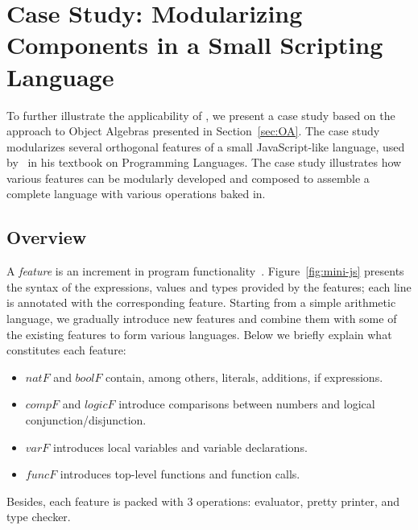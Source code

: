 \section{Case Study: Modularizing Components in a Small Scripting Language}

To further illustrate the applicability of \name, we present a case study based
on the approach to Object Algebras presented in Section~\ref{sec:OA}. The case
study modularizes several orthogonal features of a small
JavaScript-like language, used by~\citet{poplcook} in his textbook
on Programming Languages. The case study illustrates how various features can be
modularly developed and composed to assemble a complete language with
various operations baked in.



\subsection{Overview}

A \textit{feature} is an increment in program
functionality~\citep{zave1999faq,lopez2005evaluating}. Figure~\ref{fig:mini-js}
presents the syntax of the expressions, values and types provided by the
features; each line is annotated with the corresponding feature. Starting from a
simple arithmetic language, we gradually introduce new features and combine them
with some of the existing features to form various languages. Below we briefly
explain what constitutes each feature:
\begin{itemize}
\item $\mathit{natF}$ and $\mathit{boolF}$ contain, among others, literals,
  additions, if expressions.
\item $\mathit{compF}$ and $\mathit{logicF}$ introduce comparisons between
  numbers and logical conjunction/disjunction.
\item $\mathit{varF}$ introduces local variables and variable declarations.
\item $\mathit{funcF}$ introduces top-level functions and function calls.
\end{itemize}
\noindent Besides, each feature is packed with 3 operations: evaluator, pretty
printer, and type checker.

